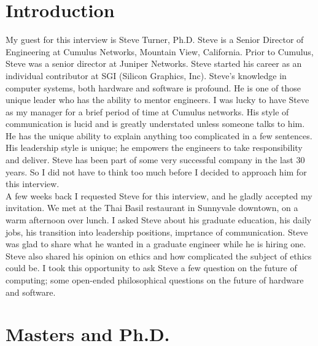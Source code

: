 \documentclass[a4paper, 12pt]{article}
\begin{document}
\doublespacing
\begin{flushleft}
        \section*{Introduction}
\normalsize My guest for this interview is Steve Turner, Ph.D. Steve is a Senior Director of Engineering at Cumulus Networks, Mountain View, California. Prior to Cumulus, Steve was a senior director at Juniper Networks. Steve started his career as an individual contributor at SGI (Silicon Graphics, Inc). Steve's knowledge in computer systems, both hardware and software is profound. He is one of those unique leader who has the ability to mentor engineers. I was lucky to have Steve as my manager for a brief period of time at Cumulus networks. His style of communication is lucid and is greatly understated unless someone talks to him. He has the unique ability to explain anything too complicated in a few sentences. His leadership style is unique; he empowers the engineers to take responsibility and deliver. Steve has been part of some very successful company in the last 30 years. So I did not have to think too much before I decided to approach him for this interview.\\
\normalsize A few weeks back I requested Steve for this interview, and he gladly accepted my invitation. We met at the Thai Basil restaurant in Sunnyvale downtown, on a warm afternoon over lunch. I asked Steve about his graduate education, his daily jobs, his transition into leadership positions, imprtance of communication. Steve was glad to share what he wanted in a graduate engineer while he is hiring one. Steve also shared his opinion on ethics and how complicated the subject of ethics could be. I took this opportunity to ask Steve a few question on the future of computing; some open-ended philosophical questions on the future of hardware and software. \\

\pagebreak

\singlespacing

        \section*{Masters and Ph.D.}


\end{flushleft}
\end{document}
